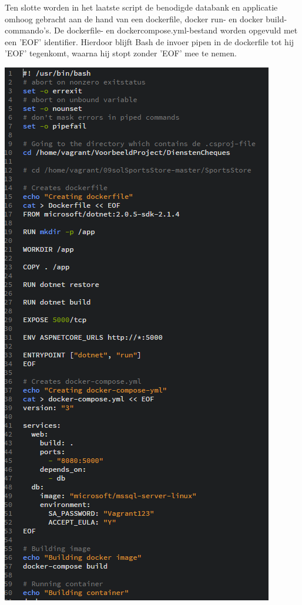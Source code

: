 Ten slotte worden in het laatste script de benodigde databank en applicatie omhoog gebracht aan de hand van een dockerfile, docker run- en docker build-commando's.
De dockerfile- en dockercompose.yml-bestand worden opgevuld met een 'EOF' identifier. Hierdoor blijft Bash de invoer pipen in de dockerfile tot hij 'EOF' tegenkomt, waarna hij stopt zonder 'EOF' mee te nemen.

\begin{center}
	\includegraphics[scale=0.6]{img/centosapplicaties01}
\end{center}